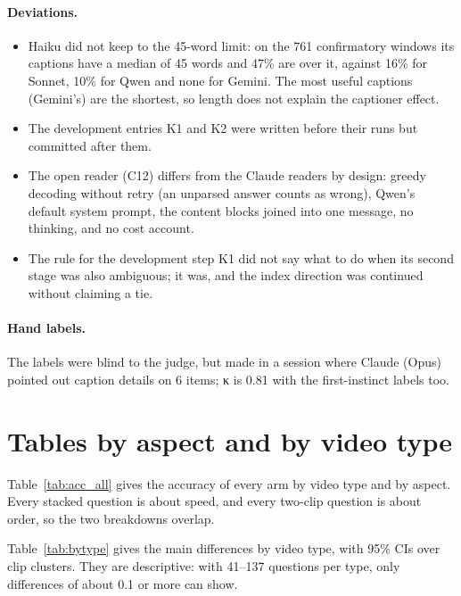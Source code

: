 \documentclass[11pt]{article}
\begin{document}
\paragraph{Deviations.}
\begin{itemize}
\item Haiku did not keep to the 45-word limit: on the 761 confirmatory windows its captions have a median of 45 words and 47\% are over it, against 16\% for Sonnet, 10\% for Qwen and none for Gemini. The most useful captions (Gemini's) are the shortest, so length does not explain the captioner effect.
\item The development entries K1 and K2 were written before their runs but committed after them.
\item The open reader (C12) differs from the Claude readers by design: greedy decoding without retry (an unparsed answer counts as wrong), Qwen's default system prompt, the content blocks joined into one message, no thinking, and no cost account.
\item The rule for the development step K1 did not say what to do when its second stage was also ambiguous; it was, and the index direction was continued without claiming a tie.
\end{itemize}

\paragraph{Hand labels.} The labels were blind to the judge, but made in a session where Claude (Opus) pointed out caption details on 6 items; κ is 0.81 with the first-instinct labels too.

\section{Tables by aspect and by video type}
\label{app:tables}
Table~\ref{tab:acc_all} gives the accuracy of every arm by video type and by aspect. Every stacked question is about speed, and every two-clip question is about order, so the two breakdowns overlap.

\begin{table}[t]
\centering
\resizebox{\textwidth}{!}{}
\caption{Accuracy by video type and by aspect, every arm (297 confirmatory questions; n in brackets).}
\label{tab:acc_all}
\end{table}

Table~\ref{tab:bytype} gives the main differences by video type, with 95\% CIs over clip clusters. They are descriptive: with 41--137 questions per type, only differences of about 0.1 or more can show.
\end{document}
